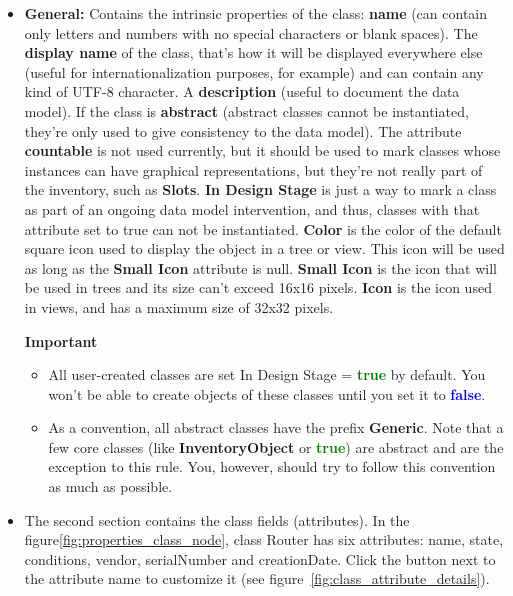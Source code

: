\documentclass[a4paper]{article}
\begin{document}
			\begin{itemize}
				\item \textbf{General:} Contains the intrinsic properties  of  the class: \textbf{name} (can contain only letters and numbers with no special characters  or  blank  spaces). The  \textbf{display name} of the class, that's how it  will be displayed everywhere else (useful  for  internationalization  purposes, for example) and can contain any kind of UTF-8 character. A \textbf{description} (useful  to  document  the  data  model). If  the class is \textbf{abstract} (abstract classes  cannot  be  instantiated, they're only used to give consistency to the  data  model). The attribute \textbf{countable} is not used currently, but it should be used to mark classes whose instances can have graphical representations, but  they're  not really  part  of  the  inventory,  such  as  \textbf{Slots}. \textbf{In Design Stage} is just a way to mark a class as part of an ongoing data model intervention, and thus, classes with that attribute set to true can not be instantiated. \textbf{Color} is the color of the default square icon used to display the object in a tree or view. This icon will be used as long as the \textbf{Small Icon} attribute is null. \textbf{Small Icon} is the icon that will be used in trees and its size can't exceed 16x16 pixels. \textbf{Icon} is the icon used in views, and has a maximum size of 32x32 pixels.
				\begin{framed} {\large \textbf{Important}}
					\begin{itemize}
						\item All user-created classes are set In Design Stage = \textbf{\textcolor{green}{true}} by default. You won't be able to create objects of these classes until you set it to \textbf{\textcolor{blue}{false}}.
						\item As a convention, all abstract classes have the prefix \textbf{Generic}. Note that a few core classes (like \textbf{InventoryObject} or \textbf{\textcolor{green}{true}}) are abstract and are the exception to this rule. You, however, should try to follow this convention as much as possible.
					\end{itemize}
				\end{framed}
				\item The second section  contains the class fields (attributes). In the  figure\ref{fig:properties_class_node}, class Router  has six attributes: name, state, conditions, vendor, serialNumber and creationDate. Click the button next to the attribute name to customize it (see figure~\ref{fig:class_attribute_details}).

\end{itemize}
\end{document}
